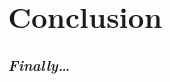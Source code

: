 \Clear
\chapter{Conclusion}
\label{cha:conclusion}

\paragraph{Finally\dots}
\label{par:finally}

\lipsum[3-4]
